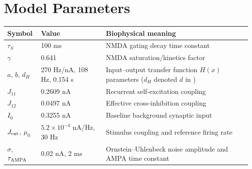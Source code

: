 \documentclass[11pt]{article}
\begin{document}
\section{Model Parameters}\label{app:params}
\begin{center}\small
	\begin{tabular}{@{}llp{}@{}}\toprule
		Symbol & Value & Biophysical meaning\\\midrule
		$\tau_S$ & 100 ms & NMDA gating decay time constant\\
		$\gamma$ & 0.641 & NMDA saturation/kinetics factor\\
		$a,\,b,\,d_H$ & 270 Hz/nA, 108 Hz, 0.154 s & Input--output transfer function $H(x)$ parameters ($d_H$ denoted $d$ in \citealp{WongWang2006})\\
		$J_{11}$ & 0.2609 nA & Recurrent self-excitation coupling\\
		$J_{12}$ & 0.0497 nA & Effective cross-inhibition coupling\\
		$I_0$ & 0.3255 nA & Baseline background synaptic input\\
		$J_{\rm ext}$, $\mu_0$ & $5.2\times10^{-4}$ nA/Hz, 30 Hz & Stimulus coupling and reference firing rate\\
		$\sigma$, $\tau_{\rm AMPA}$ & 0.02 nA, 2 ms & Ornstein--Uhlenbeck noise amplitude and AMPA time constant\\\bottomrule
	\end{tabular}
\end{center}
\end{document}
